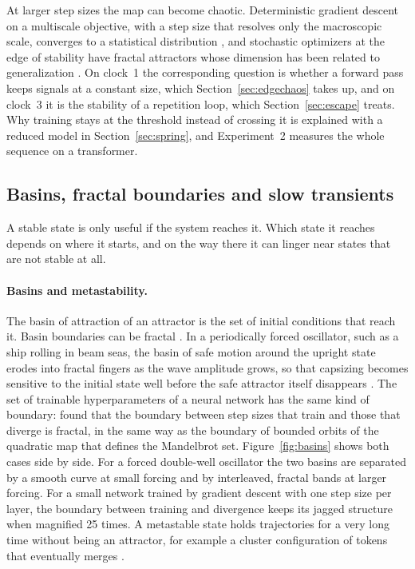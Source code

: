 At larger step sizes the map can become chaotic. Deterministic gradient descent on a multiscale objective, with a step size that resolves only the macroscopic scale, converges to a statistical distribution \citep{kong2020stochasticity}, and stochastic optimizers at the edge of stability have fractal attractors whose dimension has been related to generalization \citep{tuci2026generalization}. On clock~1 the corresponding question is whether a forward pass keeps signals at a constant size, which Section~\ref{sec:edgechaos} takes up, and on clock~3 it is the stability of a repetition loop, which Section~\ref{sec:escape} treats. Why training stays at the threshold instead of crossing it is explained with a reduced model in Section~\ref{sec:spring}, and Experiment~2 measures the whole sequence on a transformer.

\subsection{Basins, fractal boundaries and slow transients}
\label{sec:transitions}

A stable state is only useful if the system reaches it. Which state it reaches depends on where it starts, and on the way there it can linger near states that are not stable at all.

\paragraph{Basins and metastability.} The basin of attraction of an attractor is the set of initial conditions that reach it. Basin boundaries can be fractal \citep{mcdonald1985fractal}. In a periodically forced oscillator, such as a ship rolling in beam seas, the basin of safe motion around the upright state erodes into fractal fingers as the wave amplitude grows, so that capsizing becomes sensitive to the initial state well before the safe attractor itself disappears \citep{thompson1990fractal,thompson1997designing}. The set of trainable hyperparameters of a neural network has the same kind of boundary: \citet{sohldickstein2024boundary} found that the boundary between step sizes that train and those that diverge is fractal, in the same way as the boundary of bounded orbits of the quadratic map that defines the Mandelbrot set. Figure~\ref{fig:basins} shows both cases side by side. For a forced double-well oscillator the two basins are separated by a smooth curve at small forcing and by interleaved, fractal bands at larger forcing. For a small network trained by gradient descent with one step size per layer, the boundary between training and divergence keeps its jagged structure when magnified 25 times. A metastable state holds trajectories for a very long time without being an attractor, for example a cluster configuration of tokens that eventually merges \citep{geshkovski2024dynamic}.

